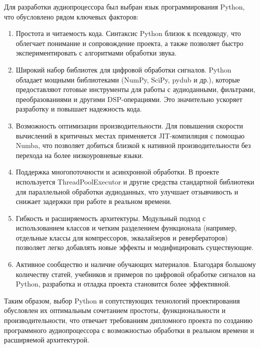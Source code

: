 Для разработки аудиопроцессора был выбран язык программирования Python, что обусловлено рядом ключевых факторов:
\begin{enumerate}
	\item Простота и читаемость кода. Синтаксис Python близок к псевдокоду, что облегчает понимание и сопровождение проекта, а также позволяет быстро экспериментировать с алгоритмами обработки звука.
	\item Широкий набор библиотек для цифровой обработки сигналов. Python обладает мощными библиотеками (NumPy, SciPy, pydub и др.), которые предоставляют готовые инструменты для работы с аудиоданными, фильтрами, преобразованиями и другими DSP-операциями. Это значительно ускоряет разработку и повышает надежность кода.
	\item Возможность оптимизации производительности. Для повышения скорости вычислений в критичных местах применяется JIT-компиляция с помощью Numba, что позволяет добиться близкой к нативной производительности без перехода на более низкоуровневые языки.
	\item Поддержка многопоточности и асинхронной обработки. В проекте используется ThreadPoolExecutor и другие средства стандартной библиотеки для параллельной обработки аудиоданных, что улучшает отзывчивость и снижает задержки при работе в реальном времени.
	\item Гибкость и расширяемость архитектуры. Модульный подход с использованием классов и четким разделением функционала (например, отдельные классы для компрессоров, эквалайзеров и ревербераторов) позволяет легко добавлять новые эффекты и модифицировать существующие.
	\item Активное сообщество и наличие обучающих материалов. Благодаря большому количеству статей, учебников и примеров по цифровой обработке сигналов на Python, разработка и отладка проекта становится более эффективной.
\end{enumerate}

Таким образом, выбор Python и сопутствующих технологий проектирования обусловлен их оптимальным сочетанием простоты, функциональности и производительности, что отвечает требованиям дипломного проекта по созданию программного аудиопроцессора с возможностью обработки в реальном времени и расширяемой архитектурой.

